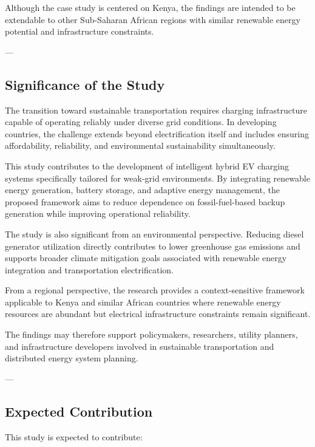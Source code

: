 Although the case study is centered on Kenya, the findings are intended to be extendable to other Sub-Saharan African regions with similar renewable energy potential and infrastructure constraints.

---

\subsection{Significance of the Study}

The transition toward sustainable transportation requires charging infrastructure capable of operating reliably under diverse grid conditions. In developing countries, the challenge extends beyond electrification itself and includes ensuring affordability, reliability, and environmental sustainability simultaneously.

This study contributes to the development of intelligent hybrid EV charging systems specifically tailored for weak-grid environments. By integrating renewable energy generation, battery storage, and adaptive energy management, the proposed framework aims to reduce dependence on fossil-fuel-based backup generation while improving operational reliability.

The study is also significant from an environmental perspective. Reducing diesel generator utilization directly contributes to lower greenhouse gas emissions and supports broader climate mitigation goals associated with renewable energy integration and transportation electrification.

From a regional perspective, the research provides a context-sensitive framework applicable to Kenya and similar African countries where renewable energy resources are abundant but electrical infrastructure constraints remain significant.

The findings may therefore support policymakers, researchers, utility planners, and infrastructure developers involved in sustainable transportation and distributed energy system planning.

---

\subsection{Expected Contribution}

This study is expected to contribute:

